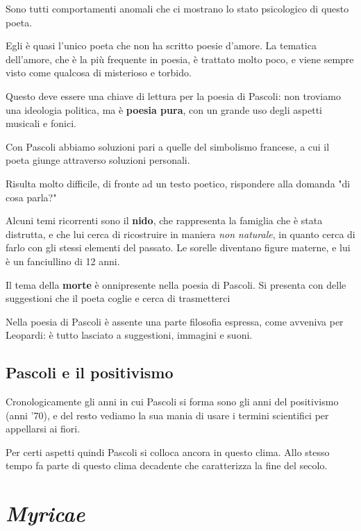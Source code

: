 Sono tutti comportamenti anomali che ci mostrano lo stato psicologico di questo poeta.

Egli è quasi l'unico poeta che non ha scritto poesie d'amore. La tematica dell'amore, che è la più frequente in poesia, è trattato molto poco, e viene sempre visto come qualcosa di misterioso e torbido.

Questo deve essere una chiave di lettura per la poesia di Pascoli: non troviamo una ideologia politica, ma è \textbf{poesia pura}, con un grande uso degli aspetti musicali e fonici.

Con Pascoli abbiamo soluzioni pari a quelle del simbolismo francese, a cui il poeta giunge attraverso soluzioni personali.

Risulta molto difficile, di fronte ad un testo poetico, rispondere alla domanda "di cosa parla?"

Alcuni temi ricorrenti sono il \textbf{nido}, che rappresenta la famiglia che è stata distrutta, e che lui cerca di ricostruire in maniera \textit{non naturale}, in quanto cerca di farlo con gli stessi elementi del passato. Le sorelle diventano figure materne, e lui è un fanciullino di 12 anni.

Il tema della \textbf{morte} è onnipresente nella poesia di Pascoli. Si presenta con delle suggestioni che il poeta coglie e cerca di trasmetterci

Nella poesia di Pascoli è assente una parte filosofia espressa, come avveniva per Leopardi: è tutto lasciato a suggestioni, immagini e suoni.


\section{Pascoli e il positivismo}

Cronologicamente gli anni in cui Pascoli si forma sono gli anni del positivismo (anni '70), e del resto vediamo la sua mania di usare i termini scientifici per appellarsi ai fiori.

Per certi aspetti quindi Pascoli si colloca ancora in questo clima. Allo stesso tempo fa parte di questo clima decadente che caratterizza la fine del secolo.



\chapter{\textit{Myricae}}

